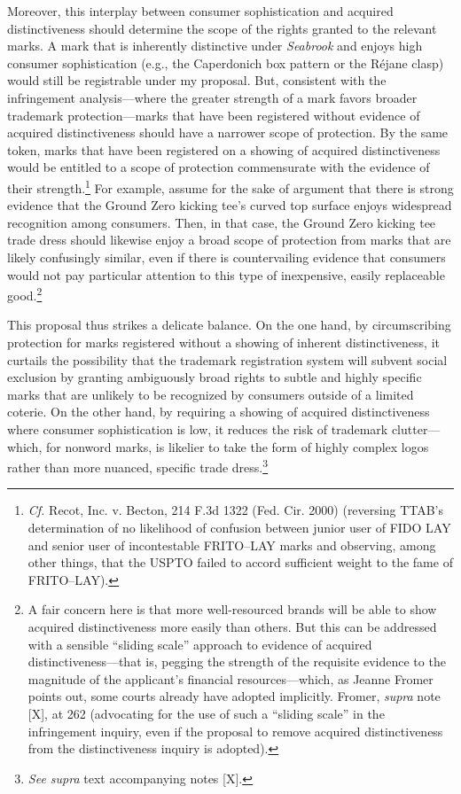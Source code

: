 \documentclass[letterpaper, 11pt, oneside]{article}
\begin{document}
Moreover, this interplay between consumer sophistication and acquired distinctiveness should determine the scope of the rights granted to the relevant marks. A mark that is inherently distinctive under \textit{Seabrook} and enjoys high consumer sophistication (e.g., the Caperdonich box pattern or the Réjane clasp) would still be registrable under my proposal. But, consistent with the infringement analysis—where the greater strength of a mark favors broader trademark protection—marks that have been registered without evidence of acquired distinctiveness should have a narrower scope of protection. By the same token, marks that have been registered on a showing of acquired distinctiveness would be entitled to a scope of protection commensurate with the evidence of their strength.\footnote{\textit{Cf.} Recot, Inc. v. Becton, 214 F.3d 1322 (Fed. Cir. 2000) (reversing TTAB's determination of no likelihood of confusion between junior user of FIDO LAY and senior user of incontestable FRITO–LAY marks and observing, among other things, that the USPTO failed to accord sufficient weight to the fame of FRITO–LAY).} For example, assume for the sake of argument that there is strong evidence that the Ground Zero kicking tee's curved top surface enjoys widespread recognition among consumers. Then, in that case, the Ground Zero kicking tee trade dress should likewise enjoy a broad scope of protection from marks that are likely confusingly similar, even if there is countervailing evidence that consumers would not pay particular attention to this type of inexpensive, easily replaceable good.\footnote{A fair concern here is that more well-resourced brands will be able to show acquired distinctiveness more easily than others. But this can be addressed with a sensible ``sliding scale'' approach to evidence of acquired distinctiveness—that is, pegging the strength of the requisite evidence to the magnitude of the applicant's financial resources—which, as Jeanne Fromer points out, some courts already have adopted implicitly. Fromer, \textit{supra} note [X], at 262 (advocating for the use of such a ``sliding scale'' in the infringement inquiry, even if the proposal to remove acquired distinctiveness from the distinctiveness inquiry is adopted).}

This proposal thus strikes a delicate balance. On the one hand, by circumscribing protection for marks registered without a showing of inherent distinctiveness, it curtails the possibility that the trademark registration system will subvent social exclusion by granting ambiguously broad rights to subtle and highly specific marks that are unlikely to be recognized by consumers outside of a limited coterie. On the other hand, by requiring a showing of acquired distinctiveness where consumer sophistication is low, it reduces the risk of trademark clutter—which, for nonword marks, is likelier to take the form of highly complex logos rather than more nuanced, specific trade dress.\footnote{\textit{See supra} text accompanying notes [X].}
\end{document}
